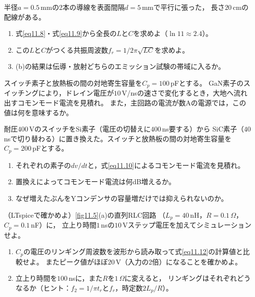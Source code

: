 \begin{章末問題}
\item \label{ex11.5}半径$a = 0.5$\,mmの2本の導線を表面間隔$d = 5$\,mmで平行に張った，
長さ$20$\,cmの配線がある。
\begin{enumerate}
\item[(a)] 式\ref{eq11.8}・式\ref{eq11.9}から全長の$L$と$C$を求めよ（$\ln 11 \approx 2.4$）。
\item[(b)] この$L$と$C$がつくる共振周波数$f_r = 1/2\pi\sqrt{LC}$を求めよ。
\item[(c)] (b)の結果は伝導・放射どちらのエミッション試験の帯域に入るか。
\end{enumerate}

\item \label{ex11.6}スイッチ素子と放熱板の間の対地寄生容量を$C_p = 100$\,pFとする。
GaN素子のスイッチングにより，ドレイン電圧が$10$\,V/nsの速さで変化するとき，大地へ流れ出すコモンモード電流を見積れ。
また，主回路の電流が数Aの電源では，この値は何を意味するか。

\item \label{ex11.7}耐圧$400$\,VのスイッチをSi素子（電圧の切替えに$400$\,ns要する）から
SiC素子（$40$\,nsで切り替わる）に置き換えた。スイッチと放熱板の間の対地寄生容量を$C_p = 200$\,pFとする。
\begin{enumerate}
\item[(a)] それぞれの素子の$dv/dt$と，式\ref{eq11.10}によるコモンモード電流を見積れ。
\item[(b)] 置換えによってコモンモード電流は何dB増えるか。
\item[(c)] なぜ増えたぶんをYコンデンサの容量増だけでは抑えられないのか。
\end{enumerate}

\item \label{ex11.8}（LTspiceで確かめよ）\ref{fig11.5}(a)の直列RLC回路
（$L_p = 40$\,nH，$R = 0.1\,\Omega$，$C_p = 0.1$\,nF）に，
立上り時間$1$\,nsの$10$\,Vステップ電圧を加えてシミュレーションせよ。
\begin{enumerate}
\item[(a)] $C_p$の電圧のリンギング周波数を波形から読み取って式\ref{eq11.12}の計算値と比較せよ。
またピーク値がほぼ$20$\,V（入力の2倍）になることを確かめよ。
\item[(b)] 立上り時間を$100$\,nsに，また$R$を$1\,\Omega$に変えると，
リンギングはそれぞれどうなるか（ヒント：$f_2 = 1/\pi t_r$と$f_r$，時定数$2L_p/R$）。
\end{enumerate}
\end{章末問題}
